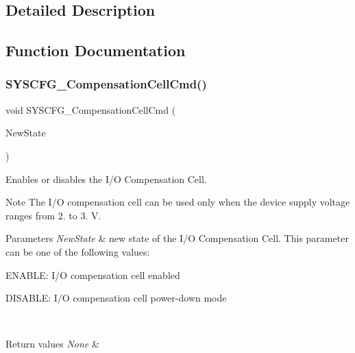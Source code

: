 \subsection{Detailed Description}


\subsection{Function Documentation}
\mbox{\label{group__SYSCFG__Private__Functions_ga85e423de2ee76b615120bde37881bb93}} 
\subsubsection{S\+Y\+S\+C\+F\+G\+\_\+\+Compensation\+Cell\+Cmd()}
{\footnotesize\ttfamily void S\+Y\+S\+C\+F\+G\+\_\+\+Compensation\+Cell\+Cmd (\begin{DoxyParamCaption}\item[{\textbf{ Functional\+State}}]{New\+State }\end{DoxyParamCaption})}



Enables or disables the I/O Compensation Cell. 

\begin{DoxyNote}{Note}
The I/O compensation cell can be used only when the device supply voltage ranges from 2. to 3. V. 
\end{DoxyNote}

\begin{DoxyParams}{Parameters}
{\em New\+State} & new state of the I/O Compensation Cell. This parameter can be one of the following values\+: \begin{DoxyItemize}
\item E\+N\+A\+B\+LE\+: I/O compensation cell enabled \item D\+I\+S\+A\+B\+LE\+: I/O compensation cell power-\/down mode \end{DoxyItemize}
\\
\hline
\end{DoxyParams}

\begin{DoxyRetVals}{Return values}
{\em None} & \\
\hline
\end{DoxyRetVals}


